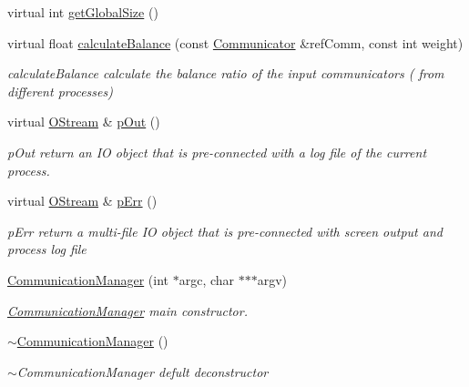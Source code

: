 \begin{DoxyCompactItemize}
\item 
virtual int \hyperlink{classHSF_1_1CommunicationManager_aa6dbe644e35edc6dd37ddb16641077bf}{getGlobalSize} ()
\item 
virtual float \hyperlink{classHSF_1_1CommunicationManager_ab75085b2af7df54a2a7991056f1b2932}{calculateBalance} (const \hyperlink{classHSF_1_1Communicator}{Communicator} \&refComm, const int weight)
\begin{DoxyCompactList}\small\item\em calculateBalance calculate the balance ratio of the input communicators ( from different processes) \item\end{DoxyCompactList}\item 
virtual \hyperlink{classHSF_1_1OStream}{OStream} \& \hyperlink{classHSF_1_1CommunicationManager_a90bf65f0e45df795cf861f829b82ac3d}{pOut} ()
\begin{DoxyCompactList}\small\item\em pOut return an IO object that is pre-\/connected with a log file of the current process. \item\end{DoxyCompactList}\item 
virtual \hyperlink{classHSF_1_1OStream}{OStream} \& \hyperlink{classHSF_1_1CommunicationManager_a416b9b36a5831fee0b931405bcad3e97}{pErr} ()
\begin{DoxyCompactList}\small\item\em pErr return a multi-\/file IO object that is pre-\/connected with screen output and process log file \item\end{DoxyCompactList}\item 
\hyperlink{classHSF_1_1CommunicationManager_a2323f6f52600227b24cf9e5419565206}{CommunicationManager} (int $\ast$argc, char $\ast$$\ast$$\ast$argv)
\begin{DoxyCompactList}\small\item\em \hyperlink{classHSF_1_1CommunicationManager}{CommunicationManager} main constructor. \item\end{DoxyCompactList}\item 
\hyperlink{classHSF_1_1CommunicationManager_ab98fc8b313467c85105bad87a7195cd8}{$\sim$CommunicationManager} ()
\begin{DoxyCompactList}\small\item\em $\sim$CommunicationManager defult deconstructor \item\end{DoxyCompactList}\item 

\end{DoxyCompactItemize}
